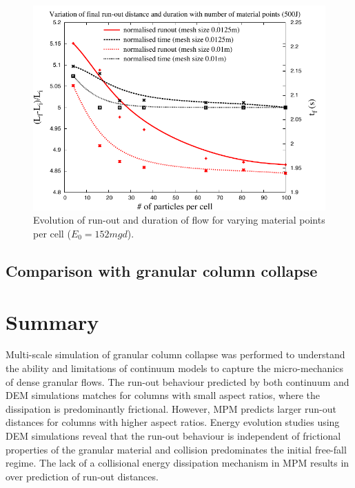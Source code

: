 \begin{figure}[tbhp]
\centering
\includegraphics[width=\textwidth]{500}
\caption{Evolution of run-out and duration of flow  for varying material points per cell ($E_0=152mgd$).}
\label{fig:500}
\end{figure}

\subsection{Comparison with granular column collapse}

\section{Summary}
Multi-scale simulation of granular column collapse was performed to understand 
the ability and limitations of continuum models to capture the micro-mechanics 
of dense granular flows. The run-out behaviour predicted by both continuum and 
DEM simulations matches for columns with small aspect ratios, where the 
dissipation is predominantly frictional. However, MPM predicts larger run-out 
distances for columns with higher aspect ratios. Energy evolution studies using 
DEM simulations reveal that the run-out behaviour is independent of frictional 
properties of the granular material and collision predominates the initial 
free-fall regime. The lack of a collisional energy dissipation mechanism in MPM 
results in over prediction of run-out distances. 